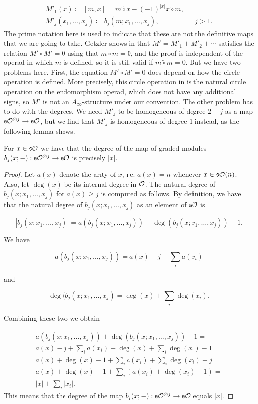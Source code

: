 \documentclass[Thesis.tex]{subfiles}
\begin{document}
\begin{align*}
M'_1(x)\coloneqq [m,x]=m\tilde{\circ} x-(-1)^{|x|}x\tilde{\circ}m, & &  \\
M'_j(x_1,\dots, x_j)\coloneqq b_j(m;x_1,\dots, x_j),& &j>1.
\end{align*}
The prime notation here is used to indicate that these are not the definitive maps that we are going to take. Getzler shows in \cite{getzler} that $M'=M'_1+M'_2+\cdots$ satisfies the relation $M'\circ M'=0$ using that $m\circ m=0$, and the proof is independent of the operad in which $m$ is defined, so it is still valid if $m\tilde{\circ}m=0$. But we have two problems here. First, the equation $M'\circ M'=0$ does depend on how the circle operation is defined. More precisely, this circle operation in \cite{getzler} is the natural circle operation on the endomorphism operad, which does not have any additional signs, so $M'$ is not an $A_\infty$-structure under our convention. The other problem has to do with the degrees. We need $M'_j$ to be homogeneous of degree $2-j$ as a map $\mathfrak{s}{\mathcal O}^{\otimes j}\to \mathfrak{s}{\mathcal O}$, but we find that $M'_j$ is homogeneous of degree 1 instead, as the following lemma shows.
\begin{lem}\label{lemmadegree}
For $x\in\mathfrak{s}{\mathcal O}$ we have that the degree of the map of graded modules $b_j(x;-):\mathfrak{s}{\mathcal O}^{\otimes j}\to\mathfrak{s}{\mathcal O}$ is precisely $|x|$.
\end{lem}
\begin{proof}
Let $a(x)$ denote the arity of $x$, i.e. $a(x)=n$ whenever $x\in\mathfrak{s}{\mathcal O}(n)$. Also, let $\deg(x)$ be its internal degree in ${\mathcal O}$. The natural degree of $b_j(x;x_1,\dots,x_j)$ for $a(x)\geq j$ is computed as follows. By definition, we have that the natural degree of $b_j(x;x_1,\dots,x_j)$ as an element of $\mathfrak{s}{\mathcal O}$ is

\[|b_j(x;x_1,\dots,x_j)|=a(b_j(x;x_1,\dots,x_j))+\deg(b_j(x;x_1,\dots,x_j))-1.\]

We have 

\[a(b_j(x;x_1,\dots,x_j))=a(x)-j+\sum_i a(x_i)\]

and 

\[\deg(b_j(x;x_1,\dots,x_j)=\deg(x)+\sum_i\deg(x_i).\]

Combining these two we obtain

\begin{align*}
a(b_j(x;x_1,\dots,x_j))+\deg(b_j(x;x_1,\dots,x_j))-1=\\
a(x)-j+\sum_i a(x_i)+\deg(x)+\sum_i\deg(x_i)-1=\\
a(x)+\deg(x)-1+\sum_i a(x_i)+\sum_i\deg(x_i)-j=\\
a(x)+\deg(x)-1+\sum_i (a(x_i)+\deg(x_i)-1)=\\
|x|+\sum_i|x_i|.
\end{align*}
This means that the degree of the map $b_j(x;-):\mathfrak{s}{\mathcal O}^{\otimes j}\to \mathfrak{s}{\mathcal O}$ equals $|x|$.

\end{proof} %
\end{document}
